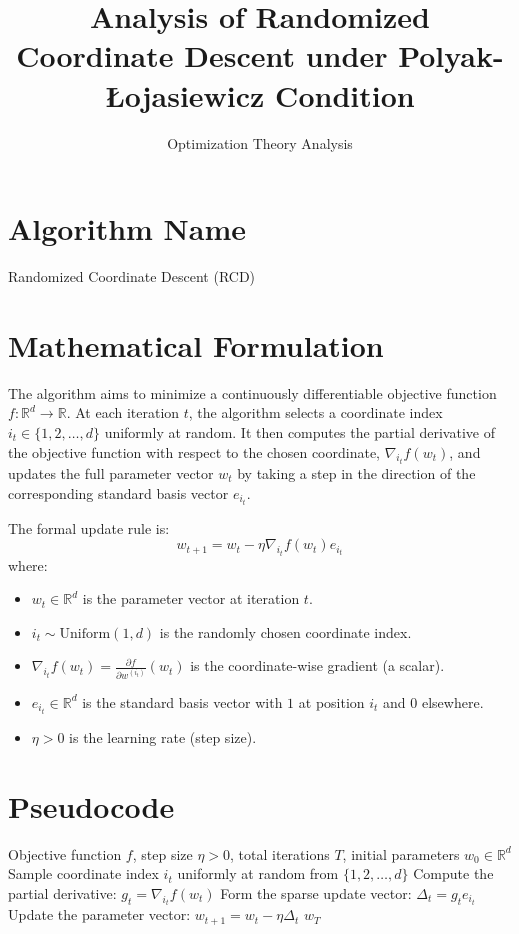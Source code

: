 \documentclass[11pt]{article}
\title{Analysis of Randomized Coordinate Descent under Polyak-\L{}ojasiewicz Condition}
\author{Optimization Theory Analysis}
\date{}
\begin{document}
\maketitle

\section*{Algorithm Name}
Randomized Coordinate Descent (RCD)

\section*{Mathematical Formulation}
The algorithm aims to minimize a continuously differentiable objective function $f: \mathbb{R}^d \to \mathbb{R}$. At each iteration $t$, the algorithm selects a coordinate index $i_t \in \{1, 2, \dots, d\}$ uniformly at random. It then computes the partial derivative of the objective function with respect to the chosen coordinate, $\nabla_{i_t} f(w_t)$, and updates the full parameter vector $w_t$ by taking a step in the direction of the corresponding standard basis vector $e_{i_t}$.

The formal update rule is:
\begin{equation}
    w_{t+1} = w_t - \eta \nabla_{i_t} f(w_t) e_{i_t}
\end{equation}
where:
\begin{itemize}
    \item $w_t \in \mathbb{R}^d$ is the parameter vector at iteration $t$.
    \item $i_t \sim \text{Uniform}(1, d)$ is the randomly chosen coordinate index.
    \item $\nabla_{i_t} f(w_t) = \frac{\partial f}{\partial w^{(i_t)}}(w_t)$ is the coordinate-wise gradient (a scalar).
    \item $e_{i_t} \in \mathbb{R}^d$ is the standard basis vector with $1$ at position $i_t$ and $0$ elsewhere.
    \item $\eta > 0$ is the learning rate (step size).
\end{itemize}

\section*{Pseudocode}
\begin{algorithm}[H]
\caption{Randomized Coordinate Descent (RCD)}
\begin{algorithmic}[1]
\REQUIRE Objective function $f$, step size $\eta > 0$, total iterations $T$, initial parameters $w_0 \in \mathbb{R}^d$
    \STATE Sample coordinate index $i_t$ uniformly at random from $\{1, 2, \dots, d\}$
    \STATE Compute the partial derivative: $g_t = \nabla_{i_t} f(w_t)$
    \STATE Form the sparse update vector: $\Delta_t = g_t e_{i_t}$
    \STATE Update the parameter vector: $w_{t+1} = w_t - \eta \Delta_t$
\ENDFOR
\RETURN $w_T$
\end{algorithmic}
\end{algorithm}
\end{document}
